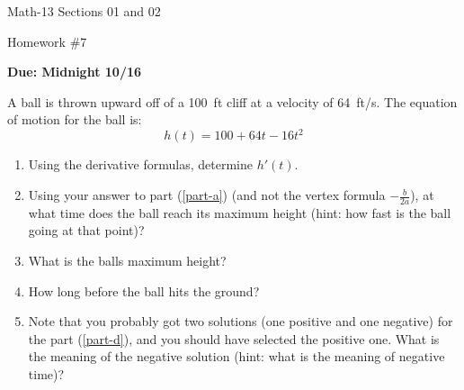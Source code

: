 \documentclass[letterpaper,12pt,fleqn]{article}
\begin{document}
\begin{center}
  \large
  Math-13 Sections 01 and 02

  \Large
  Homework \#7

  \large
  \textbf{Due: Midnight 10/16}
\end{center}

A ball is thrown upward off of a \SI{100}{ft} cliff at a velocity of \SI{64}{ft/s}.  The equation of motion for the
ball is:
\[h(t)=100+64t-16t^2\]
\begin{enumerate}[left=0in]
\item\label{part-a} Using the derivative formulas, determine \(h'(t)\).
\item Using your answer to part (\ref{part-a}) (and not the vertex formula \(-\frac{b}{2a}\)), at what time does the
  ball reach its maximum height (hint: how fast is the ball going at that point)?
\item What is the balls maximum height?
\item\label{part-d} How long before the ball hits the ground?
\item Note that you probably got two solutions (one positive and one negative) for the part (\ref{part-d}), and you
  should have selected the positive one.  What is the meaning of the negative solution (hint: what is the meaning
  of negative time)?
\end{enumerate}
\end{document}
